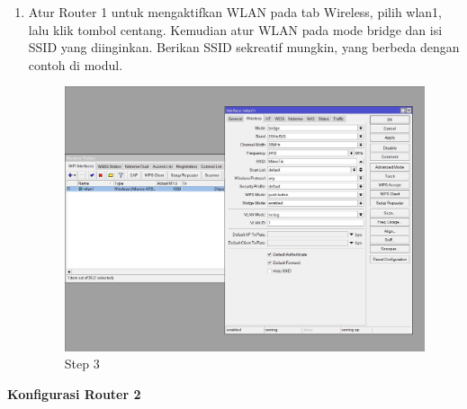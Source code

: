 \begin{enumerate}
	\item Atur Router 1 untuk mengaktifkan WLAN pada tab Wireless, pilih wlan1, lalu klik tombol centang.
	Kemudian atur WLAN pada mode bridge dan isi SSID yang diinginkan. Berikan SSID sekreatif
	mungkin, yang berbeda dengan contoh di modul.
	
	\begin{figure}[H]
		\centering
		\includegraphics[width=0.5\linewidth]{P1/img/per1pc1step3.jpg}
		\caption{Step 3}
		\label{fig:gambar4}
	\end{figure}

\end{enumerate}

\begin{center} 
	\textbf{Konfigurasi Router 2}
\end{center}


